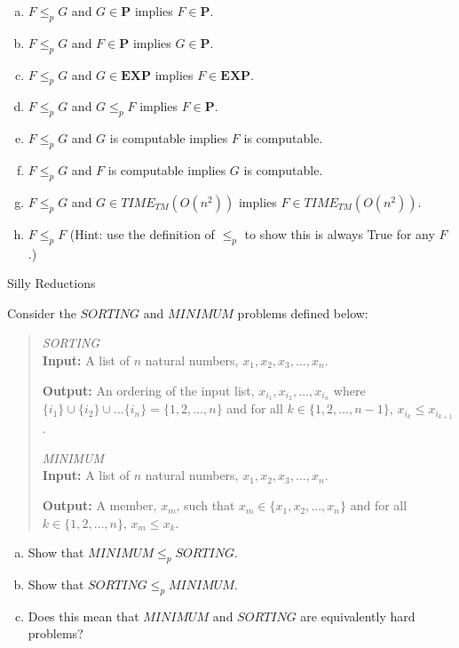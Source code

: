 \documentclass[11pt]{article}
\begin{document}
\begin{enumerate}[(a)]
    \item $F \leq_p G$ and $G \in \mathbf{P}$ implies $F \in \mathbf{P}$.
    \item $F \leq_p G$ and $F \in \mathbf{P}$ implies $G \in \mathbf{P}$.
    \item $F \leq_p G$ and $G \in \mathbf{EXP}$ implies $F \in \mathbf{EXP}$.
    \item $F \leq_p G$ and $G \leq_p F$ implies $F \in \mathbf{P}$.
    \item $F \leq_p G$ and $G$ is computable implies $F$ is computable.
    \item $F \leq_p G$ and $F$ is computable implies $G$ is computable.
    \item $F \leq_p G$ and $G \in \mathit{TIME_{TM}}(O(n^2))$ implies $F \in \mathit{TIME_{TM}}(O(n^2))$.
    \item $F \leq_p F$ (Hint: use the definition of $\leq_p$ to show this is always True for any $F$.)
\end{enumerate}

\begin{problem}
Silly Reductions
\end{problem}

Consider the $\mathit{SORTING}$ and $\mathit{MINIMUM}$ problems defined below:

\begin{quote}
\emph{SORTING} \\
{\bf Input:} A list of $n$ natural numbers, $x_1, x_2, x_3, \ldots, x_n$.

{\bf Output:} An ordering of the input list, $x_{i_1}, x_{i_2}, \ldots, x_{i_n}$ where $\{ i_1 \} \cup \{ i_ 2\} \cup \ldots \{ i_n \} = \{ 1, 2, \ldots, n \}$ and for all $k \in \{ 1, 2, \ldots, n - 1 \}$, $x_{i_k} \le x_{i_{k + 1}}$.
    
\vspace{1ex}

\emph{MINIMUM} \\
{\bf Input:} A list of $n$ natural numbers, $x_1, x_2, x_3, \ldots, x_n$.

{\bf Output:} A member, $x_m$, such that $x_m \in \{ x_1, x_2, \ldots, x_n\}$ and for all $k \in \{1, 2, \ldots, n\}$, $x_m \le x_k$.
    
\end{quote}
\begin{enumerate}[(a)]
\item Show that $\mathit{MINIMUM} \leq_p \mathit{SORTING}$.

\item Show that $\mathit{SORTING} \leq_p \mathit{MINIMUM}$.

\item Does this mean that $\mathit{MINIMUM}$ and $\mathit{SORTING}$ are equivalently hard problems?

\end{enumerate}
\end{document}
